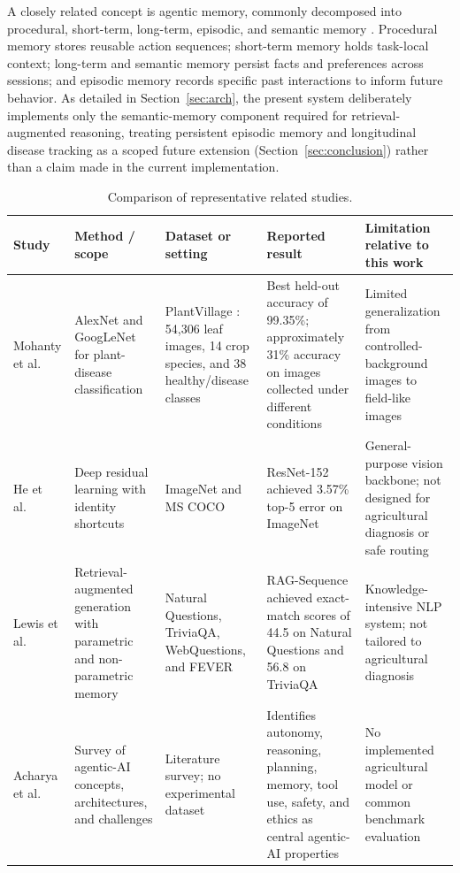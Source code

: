\documentclass[conference]{IEEEtran}
\begin{document}
A closely related concept is agentic memory, commonly decomposed into procedural, short-term, long-term, episodic, and semantic memory \cite{b1}. Procedural memory stores reusable action sequences; short-term memory holds task-local context; long-term and semantic memory persist facts and preferences across sessions; and episodic memory records specific past interactions to inform future behavior. As detailed in Section~\ref{sec:arch}, the present system deliberately implements only the semantic-memory component required for retrieval-augmented reasoning, treating persistent episodic memory and longitudinal disease tracking as a scoped future extension (Section~\ref{sec:conclusion}) rather than a claim made in the current implementation.

\begin{table}[!t]
\centering
\caption{Comparison of representative related studies.}
\label{tab:related_work_summary}
\footnotesize
\setlength{\tabcolsep}{3pt}
\renewcommand{\arraystretch}{1.12}
\begin{tabular}{p{2.0cm}p{2.8cm}p{3.2cm}p{4.0cm}p{3.5cm}}
\toprule
\textbf{Study} & \textbf{Method / scope} & \textbf{Dataset or setting} & \textbf{Reported result} & \textbf{Limitation relative to this work} \\
\midrule
Mohanty et al.\ \cite{r_mohanty2016} & AlexNet and GoogLeNet for plant-disease classification & PlantVillage \cite{r_hughes2015}: 54{,}306 leaf images, 14 crop species, and 38 healthy/disease classes & Best held-out accuracy of 99.35\%; approximately 31\% accuracy on images collected under different conditions & Limited generalization from controlled-background images to field-like images \\

He et al.\ \cite{r_he2016} & Deep residual learning with identity shortcuts & ImageNet and MS COCO & ResNet-152 achieved 3.57\% top-5 error on ImageNet & General-purpose vision backbone; not designed for agricultural diagnosis or safe routing \\

Lewis et al.\ \cite{r_lewis2020} & Retrieval-augmented generation with parametric and non-parametric memory & Natural Questions, TriviaQA, WebQuestions, and FEVER & RAG-Sequence achieved exact-match scores of 44.5 on Natural Questions and 56.8 on TriviaQA & Knowledge-intensive NLP system; not tailored to agricultural diagnosis \\

Acharya et al.\ \cite{b1} & Survey of agentic-AI concepts, architectures, and challenges & Literature survey; no experimental dataset & Identifies autonomy, reasoning, planning, memory, tool use, safety, and ethics as central agentic-AI properties & No implemented agricultural model or common benchmark evaluation \\


\end{tabular}
\end{table}
\end{document}
